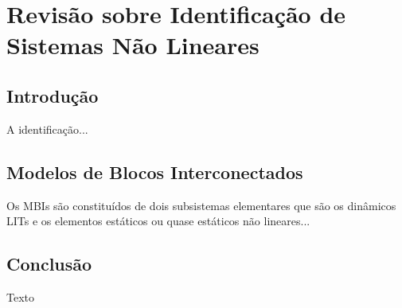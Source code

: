 \chapter{Revisão sobre Identificação de Sistemas Não Lineares}
%
\label{cap:rev} \vspace{-1cm}  \vspace{1cm}
%
\section{Introdução} 
%
\label{sec:rev_intro}
%
\par 
A identificação...
%
\section{Modelos de Blocos Interconectados} 
%
\label{sec:rev_mbi}
%
\par
Os \acsp{MBI} são constituídos de dois subsistemas elementares que são os dinâmicos \acsp{LIT} e os elementos estáticos ou quase estáticos não lineares...

\section{Conclusão} 
\par 
Texto

%
\clearpage
%